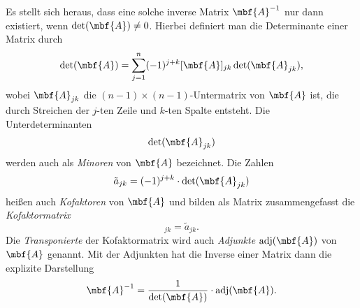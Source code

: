 Es stellt sich heraus, dass eine solche inverse Matrix $\mbf{A}^{-1}$ nur dann existiert, wenn $\det(\mbf{A})\not=0$. Hierbei definiert man die Determinante einer Matrix durch
\begin{equation}\label{}
	\det(\mbf{A}) = \sum_{j=1}^n (-1)^{j+k} [\mbf{A}]_{jk} \det(\mbf{A}_{jk}),
\end{equation}
wobei $\mbf{A}_{jk}$ die $(n-1)\times (n-1)$-Untermatrix von $\mbf{A}$ ist, die durch Streichen der $j$-ten Zeile und $k$-ten Spalte entsteht. Die Unterdeterminanten 
\begin{equation}
	\det (\mbf{A}_{jk})
\end{equation}
werden auch als \emph{Minoren} von $\mbf{A}$ bezeichnet. Die Zahlen
\begin{equation}
	\tilde {a}_{jk}=(-1)^{j+k}\cdot \det (\mbf{A}_{jk})
\end{equation}
heißen auch \emph{Kofaktoren} von $\mbf{A}$ und bilden als Matrix zusammengefasst die \emph{Kofaktormatrix} 
\begin{equation}
[\text{cof}(\mbf{A})]_{jk}={\tilde {a}}_{jk}.
\end{equation}
Die \emph{Transponierte} der Kofaktormatrix wird auch \emph{Adjunkte} $\text{adj}(\mbf{A})$ von $\mbf{A}$ genannt. Mit der Adjunkten hat die Inverse einer Matrix dann die explizite Darstellung
\begin{equation}\label{eq:inverse}
\mbf{A}^{-1}={\frac {1}{\det(\mbf{A})}}\cdot \text{adj}(\mbf{A}).
\end{equation}

